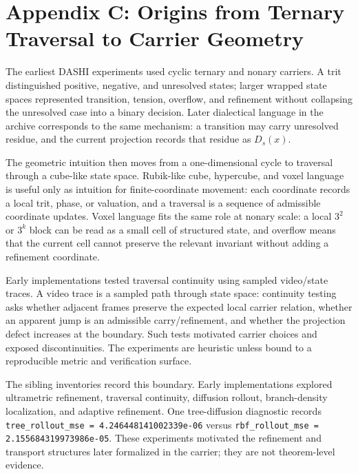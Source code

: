 \documentclass[11pt]{article}
\theoremstyle{definition}
\theoremstyle{plain}
\theoremstyle{remark}
\begin{document}
\section*{Appendix C: Origins from Ternary Traversal to Carrier Geometry}
\setcounter{figure}{0}
\renewcommand{\thefigure}{A.\arabic{figure}}
\renewcommand{\theHfigure}{appendix.A.\arabic{figure}}

The earliest DASHI experiments used cyclic ternary and nonary carriers. A
trit distinguished positive, negative, and unresolved states; larger wrapped
state spaces represented transition, tension, overflow, and refinement without
collapsing the unresolved case into a binary decision. Later dialectical
language in the archive corresponds to the same mechanism: a transition may
carry unresolved residue, and the current projection records that residue as
\(D_s(x)\).

The geometric intuition then moves from a one-dimensional cycle to traversal
through a cube-like state space. Rubik-like cube, hypercube, and voxel language
is useful only as intuition for finite-coordinate movement: each coordinate
records a local trit, phase, or valuation, and a traversal is a sequence of
admissible coordinate updates. Voxel language fits the same role at nonary
scale: a local \(3^2\) or \(3^k\) block can be read as a small cell of
structured state, and overflow means that the current cell cannot preserve the
relevant invariant without adding a refinement coordinate.

Early implementations tested traversal continuity using sampled video/state
traces. A video trace is a sampled path through state space: continuity testing
asks whether adjacent frames preserve the expected local carrier relation,
whether an apparent jump is an admissible carry/refinement, and whether the
projection defect increases at the boundary. Such tests motivated carrier
choices and exposed discontinuities. The experiments are heuristic unless
bound to a reproducible metric and verification surface.

The sibling inventories record this boundary. Early implementations explored
ultrametric refinement, traversal continuity, diffusion rollout, branch-density
localization, and adaptive refinement. One tree-diffusion diagnostic records
\texttt{tree\_rollout\_mse = 4.246448141002339e-06} versus
\texttt{rbf\_rollout\_mse = 2.155684319973986e-05}. These experiments motivated
the refinement and transport structures later formalized in the carrier; they
are not theorem-level evidence.
\end{document}

